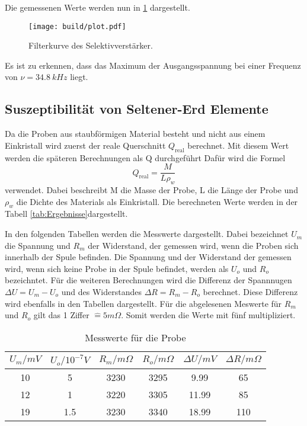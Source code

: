 \noindent Die gemessenen Werte werden nun in \ref{fig:filter} dargestellt.

\begin{figure}[H]
    \centering
    \texttt{[image: build/plot.pdf]}
    \caption{Filterkurve des Selektivverstärker.}
    \label{fig:filter}
\end{figure} 

\noindent Es ist zu erkennen, dass das Maximum der Ausgangsspannung bei einer Frequenz von $\nu = \qty{34.8}{kHz}$ liegt.

\subsection{Suszeptibilität von Seltener-Erd Elemente}

Da die Proben aus staubförmigen Material besteht und nicht aus einem Einkristall wird zuerst der reale Querschnitt $Q_\text{real}$ berechnet.
Mit diesem Wert werden die späteren Berechnungen als Q durchgeführt
Dafür wird die Formel 
\begin{equation}
    Q_\text{real} = \frac{M}{L \rho_w}
\end{equation}
verwendet.
Dabei beschreibt M die Masse der Probe, L die Länge der Probe und $\rho_w$ die Dichte des Materials als Einkristall.
Die berechneten Werte werden in der Tabell \ref{tab:Ergebnisse}dargestellt.

\noindent In den folgenden Tabellen werden die Messwerte dargestellt. Dabei bezeichnet $U_m$ die Spannung und $R_m$ der Widerstand, der gemessen wird, wenn die Proben sich
innerhalb der Spule befinden. 
Die Spannung und der Widerstand der gemessen wird, wenn sich keine Probe in der Spule befindet, werden als $U_o$ und $R_o$ bezeichntet.
Für die weiteren Berechnungen wird die Differenz der Spannnugen $\Delta U = U_m -U_o$ und des Widerstandes $\Delta R = R_m - R_o$ berechnet.
Diese Differenz wird ebenfalls in den Tabellen dargestellt.
Für die abgelesenen Meswerte für $R_m$ und $R_o$ gilt das 1 Ziffer $\widehat{=} 5 m \Omega$. 
Somit werden die Werte mit fünf multipliziert.

\begin{table}[H]
    \centering
    \caption{Messwerte für die Probe }
    \label{tab:Nd}
    \begin{tabular}{c c c c c c}
        \toprule
        $U_m / mV$ & $U_o / 10^{-7}V$ & $R_m /m\Omega$ & $R_o /m\Omega$ & $\Delta U /mV$ & $\Delta R /m\Omega$ \\
        \midrule        
        10  & 5    & 3230  & 3295  & 9.99  &   65   \\ 
        12  & 1    & 3220  & 3305  & 11.99  &  85    \\ 
        19  & 1.5  & 3230  & 3340  & 18.99  &  110    \\ 
        \bottomrule
    \end{tabular}
\end{table}

